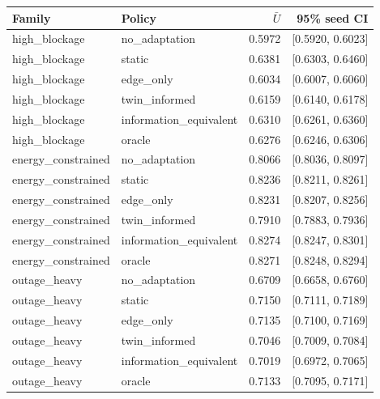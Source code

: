 \begin{tabular}{llrr}
\toprule
Family & Policy & $\bar U$ & 95\% seed CI \\
\midrule
high\_blockage & no\_adaptation & 0.5972 & [0.5920, 0.6023] \\
high\_blockage & static & 0.6381 & [0.6303, 0.6460] \\
high\_blockage & edge\_only & 0.6034 & [0.6007, 0.6060] \\
high\_blockage & twin\_informed & 0.6159 & [0.6140, 0.6178] \\
high\_blockage & information\_equivalent & 0.6310 & [0.6261, 0.6360] \\
high\_blockage & oracle & 0.6276 & [0.6246, 0.6306] \\
energy\_constrained & no\_adaptation & 0.8066 & [0.8036, 0.8097] \\
energy\_constrained & static & 0.8236 & [0.8211, 0.8261] \\
energy\_constrained & edge\_only & 0.8231 & [0.8207, 0.8256] \\
energy\_constrained & twin\_informed & 0.7910 & [0.7883, 0.7936] \\
energy\_constrained & information\_equivalent & 0.8274 & [0.8247, 0.8301] \\
energy\_constrained & oracle & 0.8271 & [0.8248, 0.8294] \\
outage\_heavy & no\_adaptation & 0.6709 & [0.6658, 0.6760] \\
outage\_heavy & static & 0.7150 & [0.7111, 0.7189] \\
outage\_heavy & edge\_only & 0.7135 & [0.7100, 0.7169] \\
outage\_heavy & twin\_informed & 0.7046 & [0.7009, 0.7084] \\
outage\_heavy & information\_equivalent & 0.7019 & [0.6972, 0.7065] \\
outage\_heavy & oracle & 0.7133 & [0.7095, 0.7171] \\
\bottomrule
\end{tabular}
